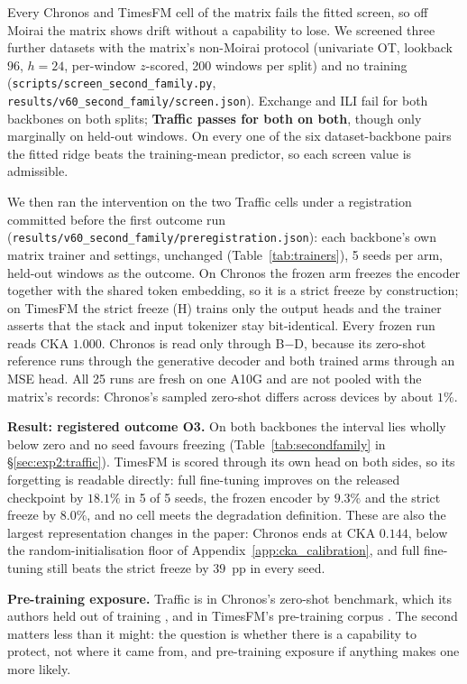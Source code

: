 Every Chronos and TimesFM cell of the matrix fails the fitted screen, so off Moirai
the matrix shows drift without a capability to lose.  We screened three further
datasets with the matrix's non-Moirai protocol (univariate OT, lookback $96$,
$h{=}24$, per-window $z$-scored, 200 windows per split) and no training
(\texttt{scripts/screen\_second\_family.py}, \texttt{results/v60\_second\_family/screen.json}).
Exchange and ILI fail for both backbones on both splits; \textbf{Traffic passes for
both on both}, though only marginally on held-out windows.  On every one of the six
dataset-backbone pairs the fitted ridge beats the training-mean predictor, so each
screen value is admissible.

We then ran the intervention on the two Traffic cells under a registration committed
before the first outcome run (\texttt{results/v60\_second\_family/preregistration.json}):
each backbone's own matrix trainer and settings, unchanged (Table~\ref{tab:trainers}),
5 seeds per arm, held-out windows as the outcome.  On Chronos the frozen arm freezes
the encoder together with the shared token embedding, so it is a strict freeze by
construction; on TimesFM the strict freeze (H) trains only the output heads and the
trainer asserts that the stack and input tokenizer stay bit-identical.  Every frozen
run reads CKA $1.000$.  Chronos is read only through B$-$D, because its zero-shot
reference runs through the generative decoder and both trained arms through an MSE
head.  All 25 runs are fresh on one A10G and are not pooled with the matrix's
records: Chronos's sampled zero-shot differs across devices by about $1\%$.


\textbf{Result: registered outcome O3.}  On both backbones the interval lies wholly
below zero and no seed favours freezing (Table~\ref{tab:secondfamily} in \S\ref{sec:exp2:traffic}).  TimesFM is
scored through its own head on both sides, so its forgetting is readable directly:
full fine-tuning improves on the released checkpoint by $18.1\%$ in 5 of 5 seeds, the
frozen encoder by $9.3\%$ and the strict freeze by $8.0\%$, and no cell meets the
degradation definition.  These are also the largest representation changes in the
paper: Chronos ends at CKA $0.144$, below the random-initialisation floor of
Appendix~\ref{app:cka_calibration}, and full fine-tuning still beats the strict
freeze by $39$~pp in every seed.

\textbf{Pre-training exposure.}  Traffic is in Chronos's zero-shot benchmark, which
its authors held out of training \citep{ansari2024chronos}, and in TimesFM's
pre-training corpus \citep{das2024timeseries}.  The second matters less than it might:
the question is whether there is a capability to protect, not where it came from,
and pre-training exposure if anything makes one more likely.

